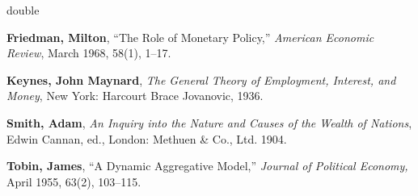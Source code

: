 \documentclass[12pt]{uthesis-v12}  %
\begin{document}
\begin{referencelist}{double}
\item \textbf{Friedman, Milton}, ``The Role of Monetary Policy,''
      \emph{American Economic Review}, March 1968, 58(1), 1--17.

\item \textbf{Keynes, John Maynard}, \emph{The General Theory of
      Employment, Interest, and Money}, New York: Harcourt Brace
      Jovanovic, 1936.

\item \textbf{Smith, Adam}, \emph{An Inquiry into the Nature and
      Causes of the Wealth of Nations}, Edwin Cannan, ed.,
      London: Methuen \& Co., Ltd. 1904.

\item \textbf{Tobin, James}, ``A Dynamic Aggregative Model,''
      \emph{Journal of Political Economy,} April 1955, 63(2),
      103--115.
\end{referencelist}


\end{document}
